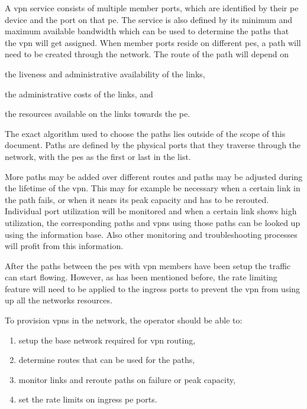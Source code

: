 A \ac{vpn} service consists of multiple member ports, which are identified by their \ac{pe} device and the port on that \ac{pe}. The service is also defined by its minimum and maximum available bandwidth which can be used to determine the paths that the \ac{vpn} will get assigned. When member ports reside on different \acp{pe}, a path will need to be created through the network. The route of the path will depend on 
\begin{inparaenum}
	\item the liveness and administrative availability of the links, 
	\item the administrative costs of the links, and 
	\item the resources available on the links towards the \ac{pe}.
\end{inparaenum}
The exact algorithm used to choose the paths lies outside of the scope of this document. Paths are defined by the physical ports that they traverse through the network, with the \acp{pe} as the first or last in the list.

More paths may be added over different routes and paths may be adjusted during the lifetime of the \ac{vpn}. This may for example be necessary when a certain link in the path fails, or when it nears its peak capacity and has to be rerouted. 
Individual port utilization will be monitored and when a certain link shows high utilization, the corresponding paths and \acp{vpn} using those paths can be looked up using the information base. Also other monitoring and troubleshooting processes will profit from this information.


After the paths between the \acp{pe} with \ac{vpn} members have been setup the traffic can start flowing. However, as has been mentioned before, the rate limiting feature will need to be applied to the ingress ports to prevent the \ac{vpn} from using up all the networks resources. 

To provision \acp{vpn} in the network, the operator should be able to:

\begin{enumerate}
	\item setup the base network required for \ac{vpn} routing,
	\item determine routes that can be used for the paths,
	\item monitor links and reroute paths on failure or peak capacity,
	\item set the rate limits on ingress \ac{pe} ports.
\end{enumerate}

